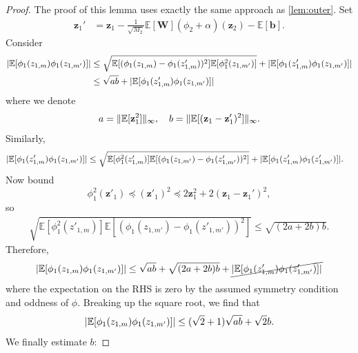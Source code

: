 \documentclass[twoside]{article}
\newcommand{\vb}{\mathbf{b}}
\newcommand{\vz}{\mathbf{z}}
\newcommand{\mW}{\mathbf{W}}
\newcommand{\E}{\mathbb{E}}
\DeclarePairedDelimiter\norm{\|}{\|}             %
\DeclarePairedDelimiter\abs{|}{|}                %
\theoremstyle{theoremstyle}
\begin{document}
\begin{proof}
    The proof of this lemma uses exactly the same approach as \cref{lem:outer}.
    Set
    \begin{align}
        \vz_1' &= \vz_1 - \tfrac1{\sqrt{M_2}}\E[\mW] (\phi_2 + \alpha)(\vz_2) - \E[\vb].
    \end{align}
    Consider
    \begin{align}
        \abs{\E[\phi_1(z_{1,m}) \phi_1(z_{1,m'})]}
        &\le
            \sqrt{\E[(\phi_1(z_{1,m}) - \phi_1(z'_{1,m}))^2] \E[\phi^2_1(z_{1,m'})]}
            + \abs{\E[\phi_1(z'_{1,m}) \phi_1(z_{1,m'})]} \\
        &\le \sqrt{ab} +\abs{\E[\phi_1(z'_{1,m}) \phi_1(z_{1,m'})]}
    \end{align}
    where we denote
    \begin{equation}
        a = \norm{\E[\vz^2_{1}]}_\infty,
        \quad
        b = \norm{\E[(\vz_{1} - \vz'_{1})^2]}_\infty.
    \end{equation}
    Similarly,
    \begin{align}
        \abs{\E[\phi_1(z'_{1,m}) \phi_1(z_{1,m'})]}
        &\le
            \sqrt{
                \E[\phi^2_1(z'_{1,m})]
                \E[(\phi_1(z_{1,m'}) - \phi_1(z'_{1,m'}))^2] 
            }
            + \abs{\E[\phi_1(z'_{1,m}) \phi_1(z'_{1,m'})]}.
    \end{align}
    Now bound
    \begin{equation}
        \phi_1^2(\vz'_{1})
        \preceq (\vz'_{1})^2
        \preceq 2 \vz^2_{1} + 2 (\vz_1 - \vz_1')^2,
    \end{equation}
    so
    \begin{align}
        \sqrt{
            \E[\phi^2_1(z'_{1,m})]
            \E[(\phi_1(z_{1,m'}) - \phi_1(z'_{1,m'}))^2] 
        }
        \le \sqrt{(2a + 2b) b}.
    \end{align}
    Therefore,
    \begin{equation}
        \abs{\E[\phi_1(z_{1,m}) \phi_1(z_{1,m'})]}
        \le \sqrt{ab} + \sqrt{(2a + 2b)b} + \cancel{\abs{\E[\phi_1(z'_{1,m}) \phi_1(z'_{1,m'})]}}
    \end{equation}
    where the expectation on the RHS is zero by the assumed symmetry condition and oddness of $\phi$.
    Breaking up the square root, we find that
    \begin{equation}
        \abs{\E[\phi_1(z_{1,m}) \phi_1(z_{1,m'})]}
        \le (\sqrt{2} + 1)\sqrt{ab} + \sqrt{2} b.
    \end{equation}
    We finally estimate $b$:

\end{proof}
\end{document}
